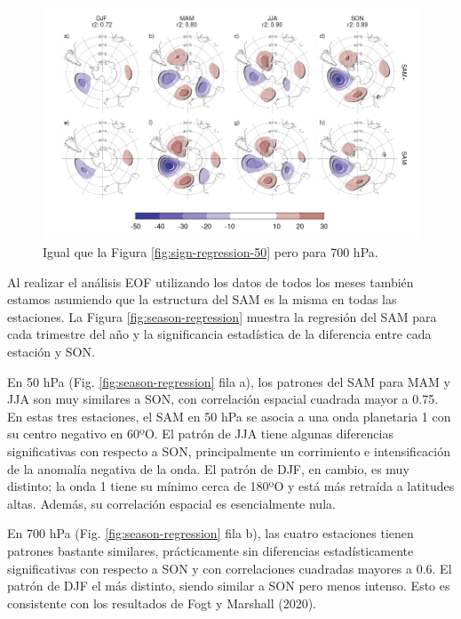 \documentclass[12pt,oneside,a4paper]{reedthesis}
\begin{document}
\begin{figure}

{\centering \includegraphics{figures/30-sam/sign-regression-700-1} 

}

\caption{Igual que la Figura \ref{fig:sign-regression-50} pero para 700 hPa.}\label{fig:sign-regression-700}
\end{figure}

Al realizar el análisis EOF utilizando los datos de todos los meses también estamos asumiendo que la estructura del SAM es la misma en todas las estaciones.
La Figura \ref{fig:season-regression} muestra la regresión del SAM para cada trimestre del año y la significancia estadística de la diferencia entre cada estación y SON.

En 50 hPa (Fig. \ref{fig:season-regression} fila a), los patrones del SAM para MAM y JJA son muy similares a SON, con correlación espacial cuadrada mayor a 0.75.
En estas tres estaciones, el SAM en 50 hPa se asocia a una onda planetaria 1 con su centro negativo en 60ºO.
El patrón de JJA tiene algunas diferencias significativas con respecto a SON, principalmente un corrimiento e intensificación de la anomalía negativa de la onda.
El patrón de DJF, en cambio, es muy distinto; la onda 1 tiene su mínimo cerca de 180ºO y está más retraída a latitudes altas.
Además, su correlación espacial es esencialmente nula.

En 700 hPa (Fig. \ref{fig:season-regression} fila b), las cuatro estaciones tienen patrones bastante similares, prácticamente sin diferencias estadísticamente significativas con respecto a SON y con correlaciones cuadradas mayores a 0.6.
El patrón de DJF el más distinto, siendo similar a SON pero menos intenso.
Esto es consistente con los resultados de Fogt y Marshall (2020).
\end{document}
